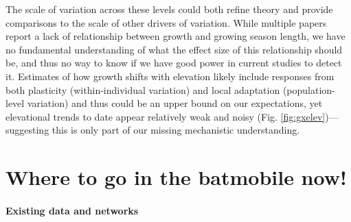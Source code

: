 \documentclass[11pt]{article}
\begin{document}

The scale of variation across these levels could both refine theory and provide comparisons to the scale of other drivers of variation. While multiple papers report a lack of relationship between growth and growing season length, we have no fundamental understanding of what the effect size of this relationship should be, and thus no way to know if we have good power in current studies to detect it. Estimates of how growth shifts with elevation likely include responses from both plasticity (within-individual variation) and local adaptation (population-level variation) and thus could be an upper bound on our expectations, yet elevational trends to date appear relatively weak and noisy (Fig. \ref{fig:gxelev})---suggesting this is only part of our missing mechanistic understanding. 

\section*{Where to go in the batmobile now!}



\paragraph{Existing data and networks}
\end{document}
